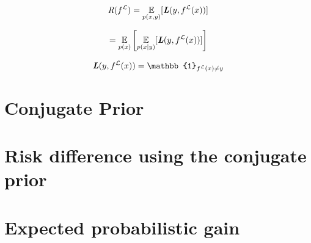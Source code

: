 \begin{equation}
\textit{R}(f^{\mathcal{L}}) = \underset{p(x,y)}{\mathbb{E}} [ \textbf{\textit{L}}(y,f^{\mathcal{L}}(x)) ]
\end{equation}

\begin{equation}
= \underset{p(x)}{\mathbb{E}} \left[ \underset{p(x|y)}{\mathbb{E}} [ \textbf{\textit{L}}(y,f^{\mathcal{L}}(x)) ] \right]
\end{equation}

\begin{equation}
\textbf{\textit{L}}(y,f^{\mathcal{L}}(x)) = \mathbb{1}_{f^{\mathcal{L}}(x)\neq y}
\end{equation}

\section{Conjugate Prior}


\section{Risk difference using the conjugate prior}


\section{Expected probabilistic gain}

